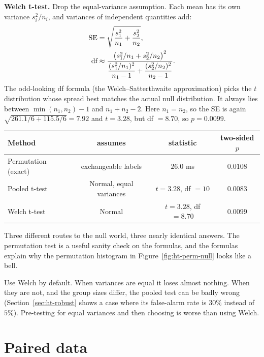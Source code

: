 \textbf{Welch t-test.} Drop the equal-variance assumption. Each mean has its own
variance $s_i^2/n_i$, and variances of independent quantities add:
\begin{align*}
  \operatorname{SE} &= \sqrt{\frac{s_1^2}{n_1}+\frac{s_2^2}{n_2}}, \\
  \text{df} &\approx \frac{\left(s_1^2/n_1 + s_2^2/n_2\right)^2}
  {\dfrac{(s_1^2/n_1)^2}{n_1-1} + \dfrac{(s_2^2/n_2)^2}{n_2-1}} .
\end{align*}
The odd-looking df formula (the Welch--Satterthwaite approximation) picks the $t$
distribution whose spread best matches the actual null distribution. It always lies
between $\min(n_1,n_2)-1$ and $n_1+n_2-2$. Here $n_1=n_2$, so the SE is again
$\sqrt{261.1/6+115.5/6} = 7.92$ and $t = 3.28$, but df $= 8.70$, so
$p = 0.0099$.

\begin{center}
\begin{tabular}{lccc}
\toprule
Method & assumes & statistic & two-sided $p$\\
\midrule
Permutation (exact) & exchangeable labels & $26.0$ ms & $0.0108$\\
Pooled t-test & Normal, equal variances & $t=3.28$, df $=10$ & $0.0083$\\
Welch t-test & Normal & $t=3.28$, df $=8.70$ & $0.0099$\\
\bottomrule
\end{tabular}
\end{center}

Three different routes to the null world, three nearly identical answers. The
permutation test is a useful sanity check on the formulas, and the formulas explain
why the permutation histogram in Figure~\ref{fig:ht-perm-null} looks like a bell.

\begin{trapbox}
Use Welch by default. When variances are equal it loses almost nothing. When
they are not, and the group sizes differ, the pooled test can be badly wrong
(Section~\ref{sec:ht-robust} shows a case where its false-alarm rate is $30\%$
instead of $5\%$). Pre-testing for equal variances and then choosing is worse than
using Welch.
\end{trapbox}

\section{Paired data}
\label{sec:ht-paired}

